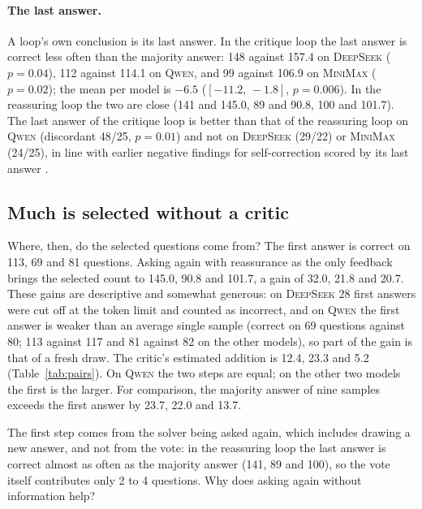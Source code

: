 \documentclass[11pt]{article}
\newcommand{\ds}{\textsc{DeepSeek}}
\newcommand{\qw}{\textsc{Qwen}}
\newcommand{\mm}{\textsc{MiniMax}}
\newcommand{\ci}[2]{$[#1,\,#2]$}
\begin{document}
\paragraph{The last answer.}
A loop's own conclusion is its last answer.
In the critique loop the last answer is correct less often than the majority answer: 148 against 157.4 on \ds{} ($p=0.04$), 112 against 114.1 on \qw, and 99 against 106.9 on \mm{} ($p=0.02$); the mean per model is $-6.5$ (\ci{-11.2}{-1.8}, $p=0.006$).
In the reassuring loop the two are close (141 and 145.0, 89 and 90.8, 100 and 101.7).
The last answer of the critique loop is better than that of the reassuring loop on \qw{} (discordant 48/25, $p=0.01$) and not on \ds{} (29/22) or \mm{} (24/25), in line with earlier negative findings for self-correction scored by its last answer \citep{huang2024cannot}.

\subsection{Much is selected without a critic}
\label{sec:mech}

Where, then, do the selected questions come from?
The first answer is correct on 113, 69 and 81 questions.
Asking again with reassurance as the only feedback brings the selected count to 145.0, 90.8 and 101.7, a gain of 32.0, 21.8 and 20.7.
These gains are descriptive and somewhat generous: on \ds{} 28 first answers were cut off at the token limit and counted as incorrect, and on \qw{} the first answer is weaker than an average single sample (correct on 69 questions against 80; 113 against 117 and 81 against 82 on the other models), so part of the gain is that of a fresh draw.
The critic's estimated addition is 12.4, 23.3 and 5.2 (Table~\ref{tab:pairs}).
On \qw{} the two steps are equal; on the other two models the first is the larger.
For comparison, the majority answer of nine samples exceeds the first answer by 23.7, 22.0 and 13.7.

The first step comes from the solver being asked again, which includes drawing a new answer, and not from the vote: in the reassuring loop the last answer is correct almost as often as the majority answer (141, 89 and 100), so the vote itself contributes only 2 to 4 questions.
Why does asking again without information help?
\end{document}
